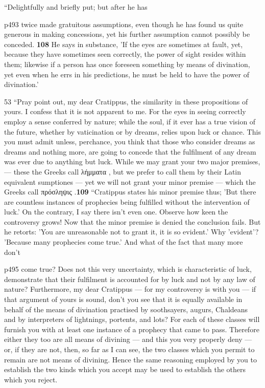 ``Delightfully and briefly put; but after he has

p493 twice made gratuitous assumptions, even though he has found us quite generous in making concessions, yet his further assumption cannot possibly be conceded. \textbf{108} He says in substance, 'If the eyes are sometimes at fault, yet, because they have sometimes seen correctly, the power of sight resides within them; likewise if a person has once foreseen something by means of divination, yet even when he errs in his predictions, he must be held to have the power of divination.'

53
``Pray point out, my dear Cratippus, the similarity in these propositions of yours. I confess that it is not apparent to me. For the eyes in seeing correctly employ a sense conferred by nature; while the soul, if it ever has a true vision of the future, whether by vaticination or by dreams, relies upon luck or chance. This you must admit unless, perchance, you think that those who consider dreams as dreams and nothing more, are going to concede that the fulfilment of any dream was ever due to anything but luck. While we may grant your two major premises, \texthebrew{—} these the Greeks call \textgreek{λήμματα} , but we prefer to call them by their Latin equivalent sumptiones \texthebrew{—} yet we will not grant your minor premise \texthebrew{—} which the Greeks call \textgreek{πρόσληψις .}\textbf{109} ``Cratippus states his minor premise thus; 'But there are countless instances of prophecies being fulfilled without the intervention of luck.' On the contrary, I say there isn't even one. Observe how keen the controversy grows! Now that the minor premise is denied the conclusion fails. But he retorts: 'You are unreasonable not to grant it, it is so evident.' Why 'evident'? 'Because many prophecies come true.' And what of the fact that many more don't

p495 come true? Does not this very uncertainty, which is characteristic of luck, demonstrate that their fulfilment is accounted for by luck and not by any law of nature? Furthermore, my dear Cratippus \texthebrew{—} for my controversy is with you \texthebrew{—} if that argument of yours is sound, don't you see that it is equally available in behalf of the means of divination practised by soothsayers, augurs, Chaldeans and by interpreters of lightnings, portents, and lots? For each of these classes will furnish you with at least one instance of a prophecy that came to pass. Therefore either they too are all means of divining \texthebrew{—} and this you very properly deny \texthebrew{—} or, if they are not, then, so far as I can see, the two classes which you permit to remain are not means of divining. Hence the same reasoning employed by you to establish the two kinds which you accept may be used to establish the others which you reject.

